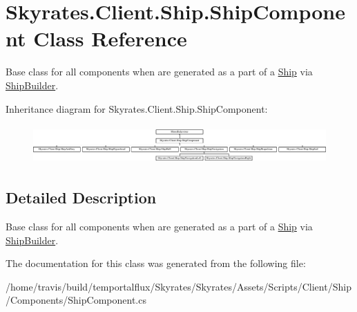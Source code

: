 \hypertarget{class_skyrates_1_1_client_1_1_ship_1_1_ship_component}{\section{Skyrates.\-Client.\-Ship.\-Ship\-Component Class Reference}
\label{class_skyrates_1_1_client_1_1_ship_1_1_ship_component}
}


Base class for all components when are generated as a part of a \hyperlink{class_skyrates_1_1_client_1_1_ship_1_1_ship}{Ship} via \hyperlink{class_skyrates_1_1_client_1_1_ship_1_1_ship_builder}{Ship\-Builder}.  


Inheritance diagram for Skyrates.\-Client.\-Ship.\-Ship\-Component\-:\begin{figure}[H]
\begin{center}
\leavevmode
\includegraphics[height=1.487384cm]{class_skyrates_1_1_client_1_1_ship_1_1_ship_component}
\end{center}
\end{figure}


\subsection{Detailed Description}
Base class for all components when are generated as a part of a \hyperlink{class_skyrates_1_1_client_1_1_ship_1_1_ship}{Ship} via \hyperlink{class_skyrates_1_1_client_1_1_ship_1_1_ship_builder}{Ship\-Builder}. 



The documentation for this class was generated from the following file\-:\begin{DoxyCompactItemize}
\item 
/home/travis/build/temportalflux/\-Skyrates/\-Skyrates/\-Assets/\-Scripts/\-Client/\-Ship/\-Components/Ship\-Component.\-cs\end{DoxyCompactItemize}

